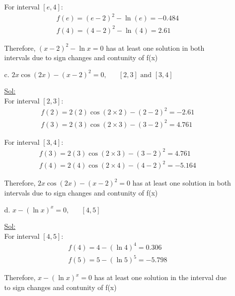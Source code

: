 \begin{enumerate}
\begin{itemize}
        For interval $[e, 4]$:
        $$
        \begin{array}{l}
          f(e) = (e-2)^2 - \ln(e) = -0.484  \\
          f(4) = (4-2)^2 - \ln(4) = 2.61
        \end{array}
        $$

        Therefore, $(x-2)^2 - \ln x = 0$ has at least one solution in
        both intervals due to sign changes and contunity of f(x)

        \bigbreak

      \item[c.] $2x \cos (2x) - (x-2)^2 = 0, \hspace{20pt} [2, 3]
        \textrm{ and } [3, 4]$

        \underline{Sol:}\\
        For interval $[2, 3]$:
        $$
        \begin{array}{l}
          f(2) = 2(2) \cos(2 \times 2) - (2 - 2)^2 = -2.61\\
          f(3) = 2(3) \cos(2 \times 3) - (3 - 2)^2 = 4.761
        \end{array}
        $$

        For interval $[3, 4]$:
        $$
        \begin{array}{l}
          f(3) = 2(3) \cos(2 \times 3) - (3 - 2)^2 = 4.761  \\
          f(4) = 2(4) \cos(2 \times 4) - (4 - 2)^2 = -5.164
        \end{array}
        $$

        Therefore, $2x \cos (2x) - (x-2)^2 = 0$ has at least one
        solution in both intervals due to sign changes and contunity of f(x)

        \bigbreak
      \item[d.] $x - (\ln x)^x = 0, \hspace{20pt} [4, 5]$

        \underline{Sol:}\\
        For interval $[4, 5]$:
        $$
        \begin{array}{l}
          f(4) = 4 - (\ln 4)^4 = 0.306\\
          f(5) = 5 - (\ln 5)^5 = -5.798
        \end{array}
        $$

        Therefore, $x - (\ln x)^x = 0$ has at least one solution in
        the interval due to sign changes and contunity of f(x)
    \end{itemize}


\end{enumerate}
